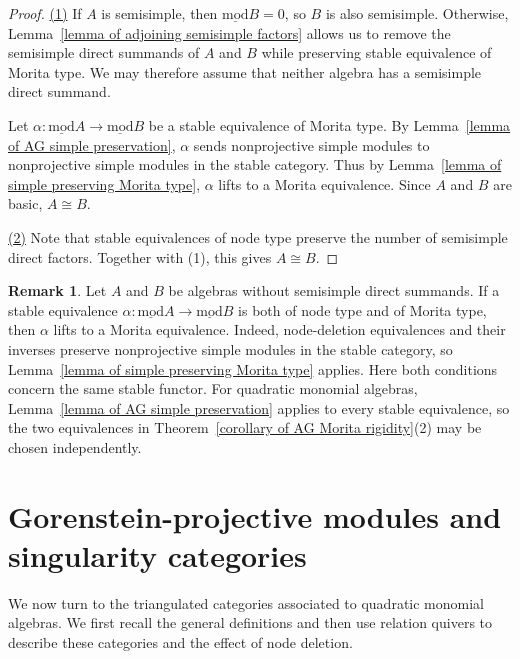 \documentclass[11pt]{article}
\newcommand{\smod}{\operatorname{\underline{mod}}}
\theoremstyle{definition}
\newtheorem{remark}[theorem]{Remark}
\begin{document}
		\begin{proof}
			\underline{(1)}
			If $A$ is semisimple, then $\smod B=0$, so $B$ is also semisimple. Otherwise, Lemma~\ref{lemma of adjoining semisimple factors} allows us to remove the semisimple direct summands of $A$ and $B$ while preserving stable equivalence of Morita type. We may therefore assume that neither algebra has a semisimple direct summand.

			Let $\alpha:\smod A\longrightarrow\smod B$ be a stable equivalence of Morita type.
			By Lemma~\ref{lemma of AG simple preservation}, $\alpha$ sends nonprojective simple modules to nonprojective simple modules in the stable category. Thus by Lemma~\ref{lemma of simple preserving Morita type}, $\alpha$ lifts to a Morita equivalence. Since $A$ and $B$ are basic, $A\cong B$.

			\medskip
			\noindent\underline{(2)}
			Note that stable equivalences of node type preserve the number of semisimple direct factors. Together with (1), this gives $A\cong B$.
		\end{proof}

		\begin{remark}\label{remark of node and Morita type}
			Let $A$ and $B$ be algebras without semisimple direct summands. If a stable equivalence $\alpha:\smod A\longrightarrow\smod B$ is both of node type and of Morita type, then $\alpha$ lifts to a Morita equivalence. Indeed, node-deletion equivalences and their inverses preserve nonprojective simple modules in the stable category, so Lemma~\ref{lemma of simple preserving Morita type} applies.
			Here both conditions concern the same stable functor. For quadratic monomial algebras, Lemma~\ref{lemma of AG simple preservation} applies to every stable equivalence, so the two equivalences in Theorem~\ref{corollary of AG Morita rigidity}(2) may be chosen independently.
		\end{remark}



\section{Gorenstein-projective modules and singularity categories}\label{section of Gorenstein and singularity categories}

	We now turn to the triangulated categories associated to quadratic monomial algebras. We first recall the general definitions and then use relation quivers to describe these categories and the effect of node deletion.
\end{document}
